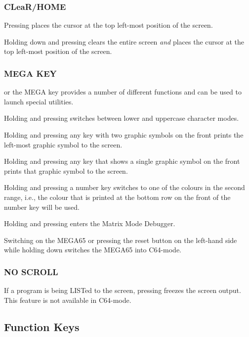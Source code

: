 \subsubsection{CLeaR/HOME}

Pressing  places the cursor at the top left-most position of the screen.

Holding down  and pressing  clears the entire screen {\it and} places the cursor at the top left-most position of the screen.

\subsubsection{MEGA KEY}

\megasymbolkey or the MEGA key provides a number of different functions and can be used to launch special utilities.

Holding  and pressing \megasymbolkey switches between lower and uppercase character modes.

Holding \megasymbolkey and pressing any key with two graphic symbols on the front prints the left-most graphic symbol to the screen.

Holding \megasymbolkey and pressing any key that shows a single graphic symbol on the front prints that graphic symbol to the screen.

Holding \megasymbolkey and pressing a number key switches to one of the colours in the second range, i.e., the colour that is printed at the bottom row on the front of the number key will be used.

Holding \megasymbolkey and pressing  enters the Matrix Mode Debugger.

Switching on the MEGA65 or pressing the reset button on the left-hand side while holding down \megasymbolkey switches the MEGA65 into C64-mode.

\subsubsection{NO SCROLL}
If a program is being LISTed to the screen, pressing  freezes the screen output. This feature is not available in C64-mode.


\subsection{Function Keys}

